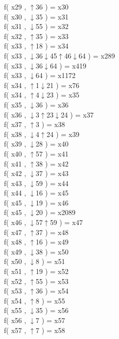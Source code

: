 f( x29 , $\uparrow$36 ) = x30 \\
f( x30 , $\downarrow$35 ) = x31 \\
f( x31 , $\downarrow$55 ) = x32 \\
f( x32 , $\uparrow$35 ) = x33 \\
f( x33 , $\uparrow$18 ) = x34 \\
f( x33 , $\downarrow$36$\downarrow$45$\uparrow$46$\downarrow$64 ) = x289 \\
f( x33 , $\downarrow$36$\downarrow$64 ) = x419 \\
f( x33 , $\downarrow$64 ) = x1172 \\
f( x34 , $\uparrow$1$\downarrow$21 ) = x76 \\
f( x34 , $\uparrow$4$\downarrow$23 ) = x35 \\
f( x35 , $\downarrow$36 ) = x36 \\
f( x36 , $\downarrow$3$\uparrow$23$\downarrow$24 ) = x37 \\
f( x37 , $\uparrow$3 ) = x38 \\
f( x38 , $\downarrow$4$\uparrow$24 ) = x39 \\
f( x39 , $\downarrow$28 ) = x40 \\
f( x40 , $\uparrow$57 ) = x41 \\
f( x41 , $\uparrow$38 ) = x42 \\
f( x42 , $\downarrow$37 ) = x43 \\
f( x43 , $\downarrow$59 ) = x44 \\
f( x44 , $\downarrow$16 ) = x45 \\
f( x45 , $\downarrow$19 ) = x46 \\
f( x45 , $\downarrow$20 ) = x2089 \\
f( x46 , $\downarrow$57$\uparrow$59 ) = x47 \\
f( x47 , $\uparrow$37 ) = x48 \\
f( x48 , $\uparrow$16 ) = x49 \\
f( x49 , $\downarrow$38 ) = x50 \\
f( x50 , $\downarrow$8 ) = x51 \\
f( x51 , $\uparrow$19 ) = x52 \\
f( x52 , $\uparrow$55 ) = x53 \\
f( x53 , $\uparrow$36 ) = x54 \\
f( x54 , $\uparrow$8 ) = x55 \\
f( x55 , $\downarrow$35 ) = x56 \\
f( x56 , $\downarrow$7 ) = x57 \\
f( x57 , $\uparrow$7 ) = x58 \\
